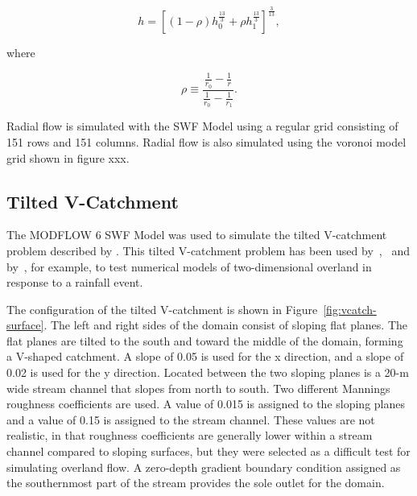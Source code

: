 \documentclass[fleqn]{article}
\begin{document}
\begin{equation}
  h = \left [ \left (1 - \rho \right ) h^{\frac{13}{3}}_{0} + \rho h^{\frac{13}{3}}_{1} \right ]^{\frac{3}{13}} ,
  \label{eqn:soln_ss}
\end{equation}

\noindent where

\begin{equation}
  \rho \equiv \frac{\frac{1}{r_{0}} - \frac{1}{r}}{\frac{1}{r_{0}} - \frac{1}{r_{1}}} .
  \label{eqn:rho_defined}
\end{equation}

Radial flow is simulated with the SWF Model using a regular grid consisting of 151 rows and 151 columns.  Radial flow is also simulated using the voronoi model grid shown in figure xxx.


\subsection{Tilted V-Catchment}

The MODFLOW 6 SWF Model was used to simulate the tilted V-catchment problem described by \cite{digiammarco1996}.  This tilted V-catchment problem has been used by~\cite{VanderKwaak1999},~\cite{panday2004} and by~\cite{hughes2015}, for example, to test numerical models of two-dimensional overland in response to a rainfall event.

The configuration of the tilted V-catchment is shown in Figure~\ref{fig:vcatch-surface}.  The left and right sides of the domain consist of sloping flat planes.  The flat planes are tilted to the south and toward the middle of the domain, forming a V-shaped catchment.  A slope of 0.05 is used for the x direction, and a slope of 0.02 is used for the y direction.  Located between the two sloping planes is a 20-m wide stream channel that slopes from north to south.  Two different Mannings roughness coefficients are used.  A value of 0.015 is assigned to the sloping planes and a value of 0.15 is assigned to the stream channel.  These values are not realistic, in that roughness coefficients are generally lower within a stream channel compared to sloping surfaces, but they were selected as a difficult test for simulating overland flow.  A zero-depth gradient boundary condition assigned as the southernmost part of the stream provides the sole outlet for the domain.
\end{document}
